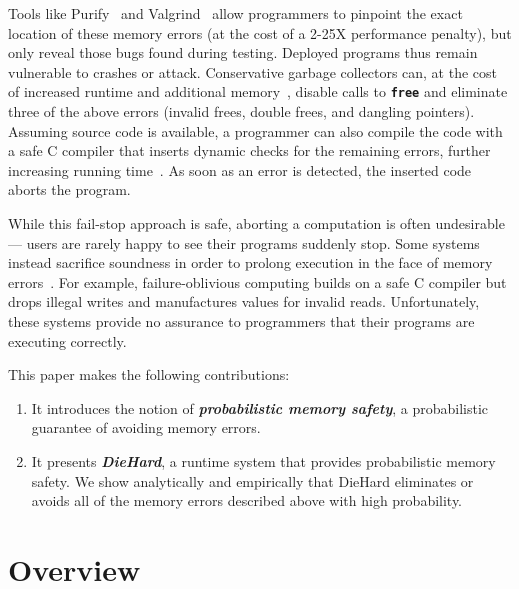 \documentclass{sig-alternate}
\newcommand{\punt}[1]{}
\newcommand{\cfunction}[1]{{\bf \tt #1}}
\newcommand{\free}{\cfunction{free}}
\begin{document}
\noindent
Tools like Purify~\cite{Hastings:91} and
Valgrind~\cite{Net:bounds-checking2004,Sew:memcheck2005} allow
programmers to pinpoint the exact location of these memory errors (at
the cost of a 2-25X performance penalty), but only reveal those bugs
found during testing. Deployed programs thus remain vulnerable to
crashes or attack. Conservative garbage collectors can, at the cost of
increased runtime and additional memory~\cite{detl93a,hert05a},
disable calls to \free{} and eliminate three of the above errors
(invalid frees, double frees, and dangling pointers). Assuming source
code is available, a programmer can also compile the code with a safe
C compiler that inserts dynamic checks for the remaining errors,
further increasing running
time~\cite{178446,1062520,503286,1029913,940113}. As soon as an error
is detected, the inserted code aborts the program.

While this fail-stop approach is safe, aborting a computation is often
undesirable --- users are rarely happy to see their programs suddenly
stop. Some systems instead sacrifice soundness in order to
prolong execution in the face of memory
errors~\cite{rx,failure-oblivious}. For example, failure-oblivious
computing builds on a safe C compiler but drops illegal writes and
manufactures values for invalid reads. Unfortunately, these systems
provide no assurance to programmers that their programs are executing
correctly.

\punt{ A recovery-based alternative, Rx~\cite{rx}, replays crashed applications
while padding object requests to limit overflows and deferring frees
to limit dangling pointer errors, but it cannot detect errors that
result in undefined behavior rather than crashes. }

This paper makes the following contributions:

\begin{enumerate}
\item It introduces the notion of \emph{\bf probabilistic memory safety}, a probabilistic guarantee of avoiding memory errors.

\item It presents \emph{\bf DieHard}, a runtime system that provides probabilistic memory safety. We show analytically and empirically that DieHard eliminates or avoids all of the memory errors described above with high probability.
\end{enumerate}


\section{Overview}
\end{document}
